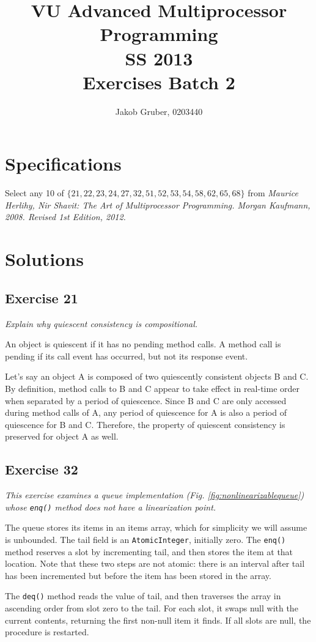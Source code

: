 \documentclass[a4paper,10pt]{article}
\title{VU Advanced Multiprocessor Programming \\
       SS 2013 \\
       Exercises Batch 2}
\author{Jakob Gruber, 0203440}
\begin{document}
\maketitle

\tableofcontents

\pagebreak

\section{Specifications}

Select any 10 of $\{21, 22, 23, 24, 27, 32, 51, 52, 53, 54, 58, 62, 65, 68\}$ 
from \emph{Maurice Herlihy, Nir Shavit: The Art of Multiprocessor Programming. 
Morgan Kaufmann, 2008. Revised 1st Edition, 2012.}

\section{Solutions}

\subsection{Exercise 21}

\emph{Explain why quiescent consistency is compositional.}

\vspace{3mm}

An object is quiescent if it has no pending method calls. A method call is pending if
its call event has occurred, but not its response event.

Let's say an object A is composed of two quiescently consistent objects B and C.
By definition, method calls to B and C appear to take effect in real-time order when
separated by a period of quiescence. Since B and C are only accessed during method calls of
A, any period of quiescence for A is also a period of quiescence for B and C. Therefore,
the property of quiescent consistency is preserved for object A as well.

\subsection{Exercise 32}

{\itshape
This exercise examines a queue implementation (Fig. \ref{fig:nonlinearizablequeue}) whose
\lstinline|enq()| method does not have a linearization point.

The queue stores its items in an items array, which for simplicity we will
assume is unbounded. The tail field is an \lstinline|AtomicInteger|, initially zero. The
\lstinline|enq()| method reserves a slot by incrementing tail, and then stores the item at
that location. Note that these two steps are not atomic: there is an interval after
tail has been incremented but before the item has been stored in the array.

The \lstinline|deq()| method reads the value of tail, and then traverses the array in
ascending order from slot zero to the tail. For each slot, it swaps null with the
current contents, returning the first non-null item it finds. If all slots are null, the
procedure is restarted.}
\end{document}
